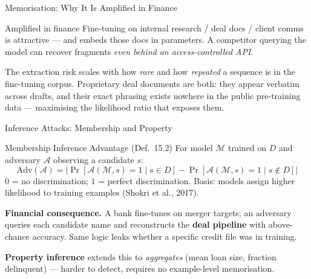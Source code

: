 \documentclass[9pt,t]{beamer}
\begin{document}
\begin{frame}{Memorisation: Why It Is Amplified in Finance}
\begin{alertblock}{Amplified in finance}
Fine-tuning on internal research / deal docs / client comms is attractive --- and
embeds those docs in parameters. A competitor querying the model can recover
fragments \emph{even behind an access-controlled API}.
\end{alertblock}

\medskip
The extraction risk scales with how \emph{rare} and how \emph{repeated} a sequence
is in the fine-tuning corpus. Proprietary deal documents are both: they appear
verbatim across drafts, and their exact phrasing exists nowhere in the public
pre-training data --- maximising the likelihood ratio that exposes them.
\end{frame}

\begin{frame}{Inference Attacks: Membership and Property}
\begin{block}{Membership Inference Advantage (Def.\ 15.2)}
For model $\mathcal{M}$ trained on $D$ and adversary $\mathcal{A}$ observing a
candidate $s$:
\[
\mathrm{Adv}(\mathcal{A}) = \bigl|\Pr[\mathcal{A}(\mathcal{M}, s){=}1 \mid s \in D]
  - \Pr[\mathcal{A}(\mathcal{M}, s){=}1 \mid s \notin D]\bigr|
\]
$0$ = no discrimination; $1$ = perfect discrimination. Basis: models assign higher
likelihood to training examples (Shokri et al., 2017).
\end{block}

\medskip
\textbf{Financial consequence.} A bank fine-tunes on merger targets; an adversary
queries each candidate name and reconstructs the \textbf{deal pipeline} with
above-chance accuracy. Same logic leaks whether a specific credit file was in training.

\medskip
\textbf{Property inference} extends this to \emph{aggregates} (mean loan size,
fraction delinquent) --- harder to detect, requires no example-level memorisation.
\end{frame}
\end{document}
